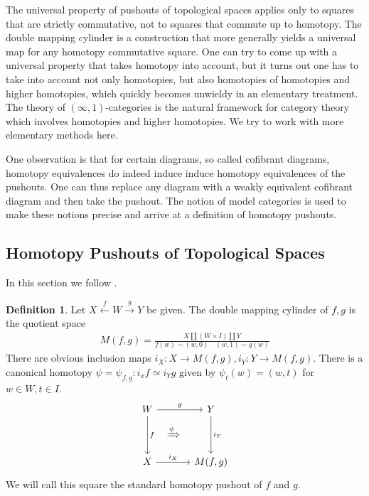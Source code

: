 \documentclass{scrartcl}
\theoremstyle{plain}
\theoremstyle{definition}
\newtheorem{definition}[theorem]{Definition}
\renewcommand{\coprod}{\mathbin{\amalg}}
\begin{document}
The universal property of pushouts of topological spaces applies only to squares that are strictly commutative, not to squares that commute up to homotopy. The double mapping cylinder is a construction that more generally yields a universal map for any homotopy commutative square. One can try to come up with a universal property that takes homotopy into account, but it turns out one has to take into account not only homotopies, but also homotopies of homotopies and higher homotopies, which quickly becomes unwieldy in an elementary treatment. The theory of $(\infty, 1)$-categories is the natural framework for category theory which involves homotopies and higher homotopies. We try to work with more elementary methods here.

One observation is that for certain diagrams, so called cofibrant diagrams, homotopy equivalences do indeed induce induce homotopy equivalences of the pushouts. One can thus replace any diagram with a weakly equivalent cofibrant diagram and then take the pushout. The notion of model categories is used to make these notions precise and arrive at a definition of homotopy pushouts. 

\subsection{Homotopy Pushouts of Topological Spaces}


In this section we follow \cite[1.2]{may2011more}.  
\begin{definition}
    Let $X\xleftarrow{f}W\xrightarrow{g}Y$ be given. The double mapping cylinder of $f, g$ is the quotient space
    \begin{align*}
        M(f, g) = \frac{X\coprod(W\times I)\coprod Y}{f(w)\sim (w,0)\quad (w, 1)\sim g(w)}
    \end{align*}
    There are obvious inclusion maps $i_X\colon X\to M(f, g), i_Y\colon Y\to M(f, g)$. There is a canonical homotopy $\psi=\psi_{f, g}\colon i_xf\simeq i_Yg$ given by $\psi_t(w) = (w, t)$ for $w\in W, t\in I$. 
    \begin{equation}
        \begin{tikzcd}[column sep=.2cm, row sep=.2cm]
            W \arrow[rr,"g"]\arrow[dd,"f"] && Y \arrow[dd, "i_Y"] \\
            & \xRightarrow{\psi} & \\
            X \arrow[rr, "i_X"] && M(f, g)
        \end{tikzcd}
    \end{equation}
    We will call this square the standard homotopy pushout of $f$ and $g$.
\end{definition}
\end{document}
